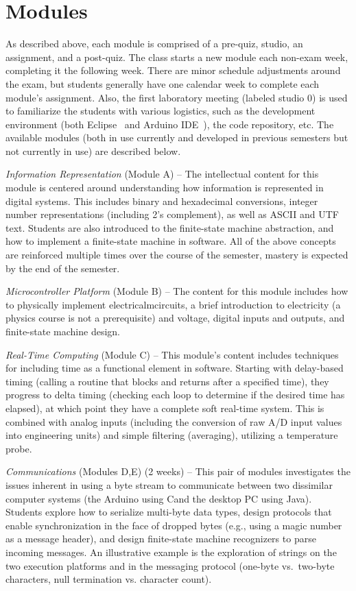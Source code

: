 \section{Modules}
\label{sec:weeks}

As described above, each module is comprised of a pre-quiz, studio, an assignment, and a post-quiz.  The class starts a new module each non-exam week, completing it the following week. There are minor schedule adjustments around the exam, but students generally have one calendar week to complete each module's assignment. Also, the first laboratory meeting (labeled studio 0) is used to familiarize the students with various logistics, such as the development environment (both Eclipse~\cite{eclipse} and Arduino IDE~\cite{arduino}), the code repository, etc. The available modules (both in use currently and developed in previous semesters but not currently in use) are described below.

\emph{Information Representation} (Module A) --
The intellectual content for this module is centered around understanding how information is represented in digital systems. This includes binary and hexadecimal conversions, integer number representations (including 2's complement), as well as ASCII and UTF text.  Students are also introduced to the finite-state machine abstraction, and how to implement a finite-state machine in software. All of the above concepts are reinforced multiple times over the course of the semester, mastery is expected by the end of the semester.

\emph{Microcontroller Platform} (Module B) --
The content for this module includes how to physically implement electricalmcircuits, a brief introduction to electricity (a physics course is not a prerequisite) and voltage, digital inputs and outputs, and finite-state machine design.

\emph{Real-Time Computing} (Module C) --
This module's content includes techniques for including time as a functional element in software. Starting with delay-based timing (calling a routine that blocks and returns after a specified time), they progress to delta timing (checking each loop to determine if the desired time has elapsed), at which point they have a complete soft real-time system.  This is combined with analog inputs (including the conversion of raw A/D  input values into engineering units) and simple filtering (averaging), utilizing a temperature probe.

\emph{Communications} (Modules D,E) (2 weeks) --
This pair of modules investigates the issues inherent in using a byte stream to communicate between two dissimilar computer systems (the Arduino using Cand the desktop PC using Java).  Students explore how to serialize multi-byte data types, design protocols that enable synchronization in the face of dropped bytes (e.g., using a magic number as a message header), and design finite-state machine recognizers to parse incoming messages. An illustrative example is the exploration of strings on the two execution platforms and in the messaging protocol (one-byte vs.~two-byte characters, null termination vs. character count).

